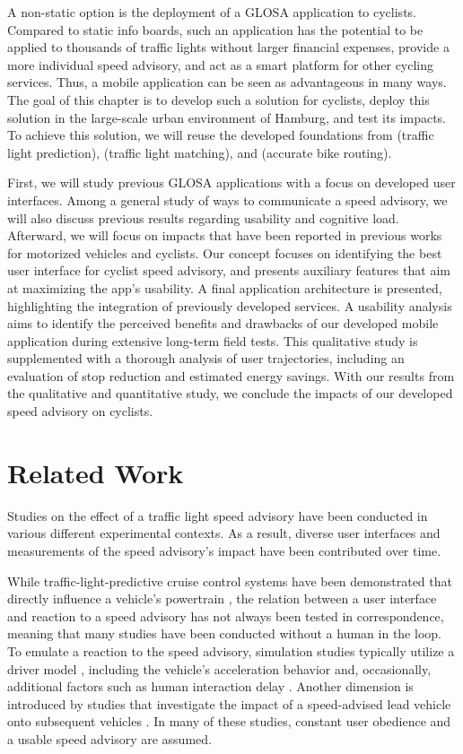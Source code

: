 A non-static option is the deployment of a GLOSA application to cyclists. Compared to static info boards, such an application has the potential to be applied to thousands of traffic lights without larger financial expenses, provide a more individual speed advisory, and act as a smart platform for other cycling services. Thus, a mobile application can be seen as advantageous in many ways. The goal of this chapter is to develop such a solution for cyclists, deploy this solution in the large-scale urban environment of Hamburg, and test its impacts. To achieve this solution, we will reuse the developed foundations from  (traffic light prediction),  (traffic light matching), and  (accurate bike routing).

First, we will study previous GLOSA applications with a focus on developed user interfaces. Among a general study of ways to communicate a speed advisory, we will also discuss previous results regarding usability and cognitive load. Afterward, we will focus on impacts that have been reported in previous works for motorized vehicles and cyclists. Our concept focuses on identifying the best user interface for cyclist speed advisory, and presents auxiliary features that aim at maximizing the app's usability. A final application architecture is presented, highlighting the integration of previously developed services. A usability analysis aims to identify the perceived benefits and drawbacks of our developed mobile application during extensive long-term field tests. This qualitative study is supplemented with a thorough analysis of user trajectories, including an evaluation of stop reduction and estimated energy savings. With our results from the qualitative and quantitative study, we conclude the impacts of our developed speed advisory on cyclists. 

\section{Related Work}\label{sec:rw-uis}

Studies on the effect of a traffic light speed advisory have been conducted in various different experimental contexts. As a result, diverse user interfaces and measurements of the speed advisory's impact have been contributed over time. 

While traffic-light-predictive cruise control systems have been demonstrated that directly influence a vehicle's powertrain \cite{raubitschek_predictive_2011}, the relation between a user interface and reaction to a speed advisory has not always been tested in correspondence, meaning that many studies have been conducted without a human in the loop. To emulate a reaction to the speed advisory, simulation studies typically utilize a driver model \cite{hu_lane-level_2023}, including the vehicle's acceleration behavior and, occasionally, additional factors such as human interaction delay \cite{schlamp_2023_glosa}. Another dimension is introduced by studies that investigate the impact of a speed-advised lead vehicle onto subsequent vehicles \cite{preuk_does_2016, preuk_should_2018}. In many of these studies, constant user obedience and a usable speed advisory are assumed.

